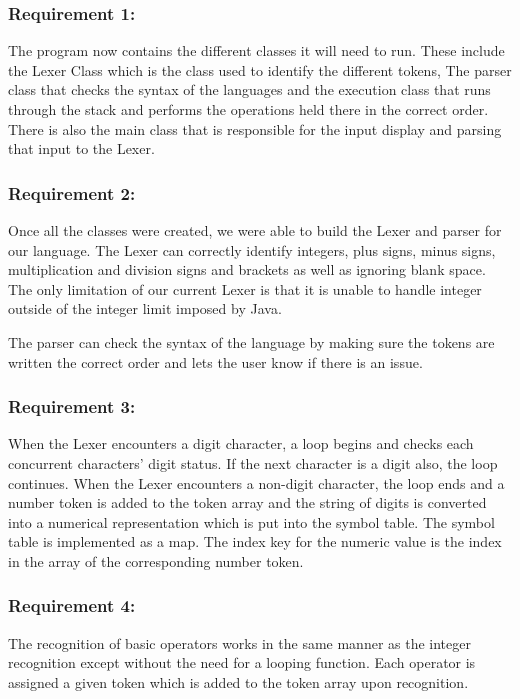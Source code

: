 \documentclass[a4paper, oneside, 11pt]{report}
\begin{document}
\subsubsection{Requirement 1: }

The program now contains the different classes it will need to run. These include the Lexer Class which is the class used to identify the different tokens, The parser class that checks the syntax of the languages and the execution class that runs through the stack and performs the operations held there in the correct order. There is also the main class that is responsible for the input display and parsing that input to the Lexer. 

\subsubsection{Requirement 2: }

Once all the classes were created, we were able to build the Lexer and parser for our language. The Lexer can correctly identify integers, plus signs, minus signs, multiplication and division signs and brackets as well as ignoring blank space. The only limitation of our current Lexer is that it is unable to handle integer outside of the integer limit imposed by Java. 

The parser can check the syntax of the language by making sure the tokens are written the correct order and lets the user know if there is an issue. 

\subsubsection{Requirement 3: }

When the Lexer encounters a digit character, a loop begins and checks each concurrent characters’ digit status. If the next character is a digit also, the loop continues. When the Lexer encounters a non-digit character, the loop ends and a number token is added to the token array and the string of digits is converted into a numerical representation which is put into the symbol table. The symbol table is implemented as a map. The index key for the numeric value is the index in the array of the corresponding number token. 

\subsubsection{Requirement 4: }

The recognition of basic operators works in the same manner as the integer recognition except without the need for a looping function. Each operator is assigned a given token which is added to the token array upon recognition. 
\end{document}

